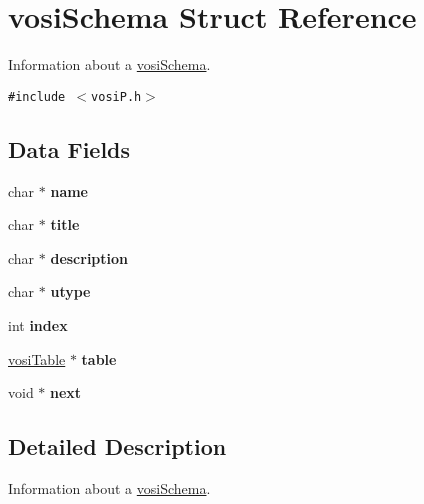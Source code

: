 \hypertarget{structvosiSchema}{
\section{vosiSchema Struct Reference}
\label{structvosiSchema}
}
Information about a \hyperlink{structvosiSchema}{vosiSchema}.  


{\tt \#include $<$vosiP.h$>$}

\subsection*{Data Fields}
\begin{CompactItemize}
\item 
\hypertarget{structvosiSchema_71d7cec2acc8281c73e3e9a979a789ec}{
char $\ast$ \textbf{name}}
\label{structvosiSchema_71d7cec2acc8281c73e3e9a979a789ec}

\item 
\hypertarget{structvosiSchema_2035280773f0c9ff9ed8d9fc7adc1953}{
char $\ast$ \textbf{title}}
\label{structvosiSchema_2035280773f0c9ff9ed8d9fc7adc1953}

\item 
\hypertarget{structvosiSchema_74cd30591b7d3ab2f7d433def85f5095}{
char $\ast$ \textbf{description}}
\label{structvosiSchema_74cd30591b7d3ab2f7d433def85f5095}

\item 
\hypertarget{structvosiSchema_a3bca9b5affc6f55bcf46d8fd6f687c6}{
char $\ast$ \textbf{utype}}
\label{structvosiSchema_a3bca9b5affc6f55bcf46d8fd6f687c6}

\item 
\hypertarget{structvosiSchema_6716d5561375b21a091f008cb25ff72d}{
int \textbf{index}}
\label{structvosiSchema_6716d5561375b21a091f008cb25ff72d}

\item 
\hypertarget{structvosiSchema_d023593759322c090d5ac4d1c8f9071a}{
\hyperlink{structvosiTable}{vosiTable} $\ast$ \textbf{table}}
\label{structvosiSchema_d023593759322c090d5ac4d1c8f9071a}

\item 
\hypertarget{structvosiSchema_c3e9623476a7fc9cbf7a07c4af7095c7}{
void $\ast$ \textbf{next}}
\label{structvosiSchema_c3e9623476a7fc9cbf7a07c4af7095c7}

\end{CompactItemize}


\subsection{Detailed Description}
Information about a \hyperlink{structvosiSchema}{vosiSchema}. 

